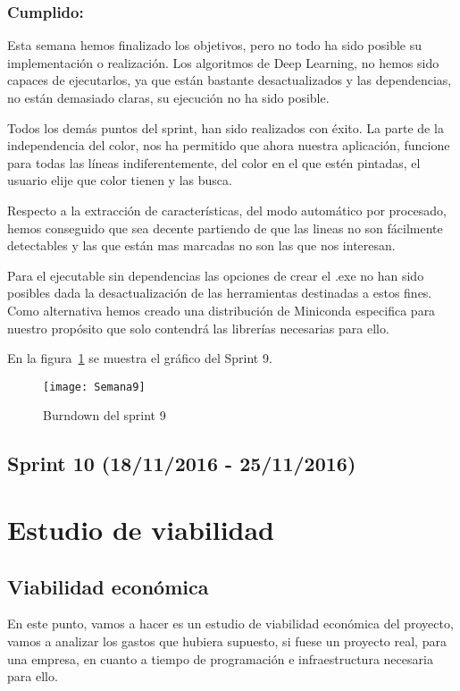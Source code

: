 \subsubsection{Cumplido:}
Esta semana hemos finalizado los objetivos, pero no todo ha sido posible su implementación o realización.
Los algoritmos de Deep Learning, no hemos sido capaces de ejecutarlos, ya que están bastante desactualizados y las dependencias, no están demasiado claras, su ejecución no ha sido posible.

Todos los demás puntos del sprint, han sido realizados con éxito.
La parte de la independencia del color, nos ha permitido que ahora nuestra aplicación, funcione para todas las líneas indiferentemente, del color en el que estén pintadas, el usuario elije que color tienen y las busca.

Respecto a la extracción de características, del modo automático por procesado, hemos conseguido que sea decente partiendo de que las lineas no son fácilmente detectables y las que están mas marcadas no son las que nos interesan.

Para el ejecutable sin dependencias las opciones de crear el .exe no han sido posibles dada la desactualización de las herramientas destinadas a estos fines.
Como alternativa hemos creado una distribución de Miniconda especifica para nuestro propósito que solo contendrá las librerías necesarias para ello.

En la figura~\ref{fig:A.2.9} se muestra el gráfico del Sprint 9.

\begin{figure}[h]
\centering
\texttt{[image: Semana9]}
\caption{Burndown del sprint 9}
\label{fig:A.2.9}
\end{figure}


\subsection{Sprint 10 (18/11/2016 - 25/11/2016)}


\section{Estudio de viabilidad}

\subsection{Viabilidad económica}
En este punto, vamos a hacer es un estudio de viabilidad económica del proyecto, vamos a analizar los gastos que hubiera supuesto, si fuese un proyecto real, para una empresa, en cuanto a tiempo de programación e infraestructura necesaria para ello.



